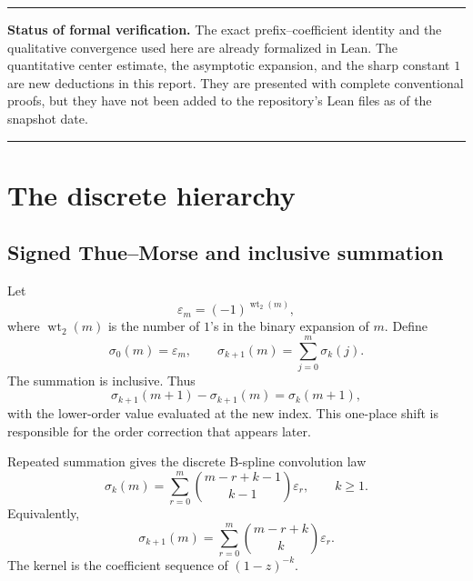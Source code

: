 \documentclass[11pt,oneside]{article}
\theoremstyle{definition}
\theoremstyle{remark}
\newcommand{\wt}{\operatorname{wt}_2}
\newenvironment{boxedremark}{%
  \par\smallskip\noindent\begin{center}\begin{minipage}{0.94\textwidth}%
  \color{black}\hrule\vspace{0.6em}\small
}{%
  \vspace{0.6em}\hrule\end{minipage}\end{center}\smallskip
}
\begin{document}
\begin{boxedremark}
\textbf{Status of formal verification.}
The exact prefix--coefficient identity and the qualitative convergence used here
are already formalized in Lean.  The quantitative center estimate, the asymptotic
expansion, and the sharp constant $1$ are new deductions in this report.  They
are presented with complete conventional proofs, but they have not been added to
the repository's Lean files as of the snapshot date.
\end{boxedremark}

\section{The discrete hierarchy}
\label{sec:discrete}

\subsection{Signed Thue--Morse and inclusive summation}

Let
\begin{equation}
 \varepsilon_m=(-1)^{\wt(m)},                              \label{eq:tm-sign}
\end{equation}
where $\wt(m)$ is the number of $1$'s in the binary expansion of $m$.  Define
\begin{equation}
 \sigma_0(m)=\varepsilon_m,
 \qquad
 \sigma_{k+1}(m)=\sum_{j=0}^{m}\sigma_k(j).                \label{eq:prefix-def}
\end{equation}
The summation is inclusive.  Thus
\begin{equation}
 \sigma_{k+1}(m+1)-\sigma_{k+1}(m)=\sigma_k(m+1),           \label{eq:forward-difference}
\end{equation}
with the lower-order value evaluated at the new index.  This one-place shift is
responsible for the order correction that appears later.

Repeated summation gives the discrete B-spline convolution law
\begin{equation}
 \sigma_k(m)=\sum_{r=0}^{m}
 \binom{m-r+k-1}{k-1}\varepsilon_r,
 \qquad k\ge1.                                             \label{eq:binomial-convolution}
\end{equation}
Equivalently,
\begin{equation}
 \sigma_{k+1}(m)=\sum_{r=0}^{m}
 \binom{m-r+k}{k}\varepsilon_r.                            \label{eq:binomial-convolution-shift}
\end{equation}
The kernel is the coefficient sequence of $(1-z)^{-k}$.
\end{document}
